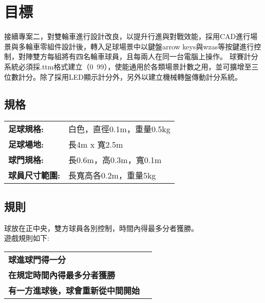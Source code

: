 \chapter{目標}
接續專案二，對雙輪車進行設計改良，以提升行進與對戰效能，採用CAD進行場景與多輪車零組件設計後，轉入足球場景中以鍵盤arrow keys與wzas等按鍵進行控制，對陣雙方每組將有四名輪車球員，且每兩人在同一台電腦上操作。
球賽計分系統必須採.ttm格式建立（0~99），使能通用於各類場景計數之用，並可擴增至三位數計分。除了採用LED顯示計分外，另外以建立機械轉盤傳動計分系統。

\section{規格}
\begin{tabular}{p{8cm}p{1cm}}
  \textbf{足球規格:} & 白色，直徑0.1m，重量0.5kg \\
  \textbf{足球場地:} & 長4m x 寬2.5m \\
  \textbf{球門規格:} & 長0.6m，高0.3m，寬0.1m \\
  \textbf{球員尺寸範圍:} & 長寬高各0.2m，重量5kg \\
\end{tabular}

\section{規則}
球放在正中央，雙方球員各別控制，時間內得最多分者獲勝。 \\
遊戲規則如下:
\begin{tabular}{p{8cm}p{1cm}}
  \textbf{球進球門得一分} \\
  \textbf{在規定時間內得最多分者獲勝} \\
  \textbf{有一方進球後，球會重新從中間開始} \\
\end{tabular}
